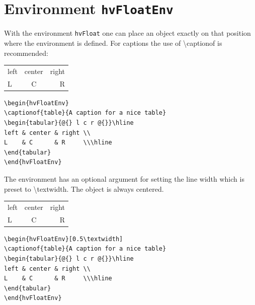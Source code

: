 \documentclass{scrartcl}
\newcommand\CMD[1]{{\small\ttfamily\textbackslash{}#1}}
\begin{document}
\section{Environment \texttt{hvFloatEnv}}\label{sec:env}

With the environment \texttt{hvFloat} one can place an object exactly on that position where the
environment is defined. For captions the use of \CMD{captionof} is recommended:

\begin{hvFloatEnv}
\begin{tabular}{@{} l c r @{}}\hline
left & center & right \\
L    & C      & R     \\\hline
\end{tabular}
\end{hvFloatEnv}

\begin{lstlisting}
\begin{hvFloatEnv}
\captionof{table}{A caption for a nice table}
\begin{tabular}{@{} l c r @{}}\hline
left & center & right \\
L    & C      & R     \\\hline
\end{tabular}
\end{hvFloatEnv}
\end{lstlisting}

The environment has an optional argument for setting the line width which is preset to \CMD{textwidth}.
The object is always centered.

\begin{hvFloatEnv}[0.5\textwidth]
\begin{tabular}{@{} l c r @{}}\hline
left & center & right \\
L    & C      & R     \\\hline
\end{tabular}
\end{hvFloatEnv}

\begin{lstlisting}
\begin{hvFloatEnv}[0.5\textwidth]
\captionof{table}{A caption for a nice table}
\begin{tabular}{@{} l c r @{}}\hline
left & center & right \\
L    & C      & R     \\\hline
\end{tabular}
\end{hvFloatEnv}
\end{lstlisting}
\end{document}
